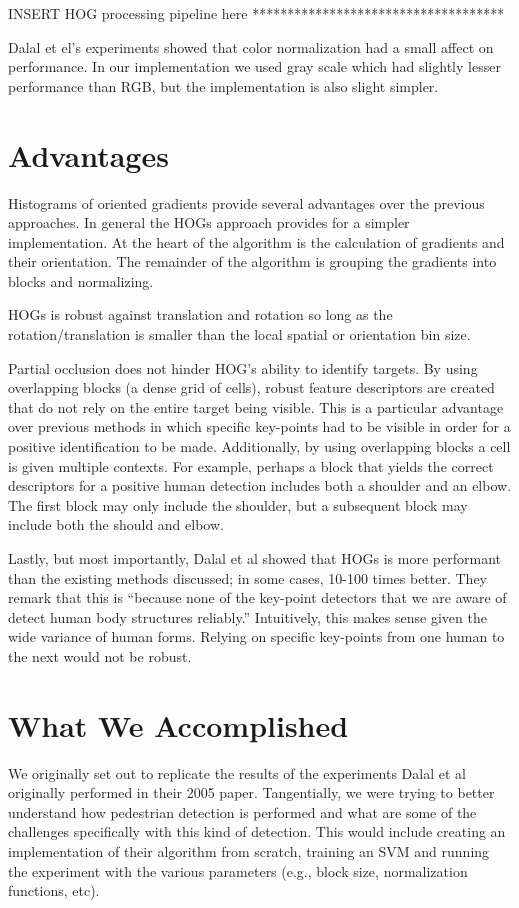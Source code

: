 \documentclass[a4paper,11pt]{article}
\begin{document}
\begin{multicols}{2}
INSERT HOG processing pipeline here ************************************

Dalal et el's experiments showed that color normalization had a small affect on performance. 
In our implementation we used gray scale which had slightly lesser performance than RGB, 
but the implementation is also slight simpler.

\section{Advantages}
Histograms of oriented gradients provide several advantages over the previous approaches. In general the HOGs 
approach provides for a simpler implementation. At the heart of the algorithm is the calculation of gradients 
and their orientation. The remainder of the algorithm is grouping the gradients into blocks and normalizing.

HOGs is robust against translation and rotation so long as the rotation/translation is smaller than the local 
spatial or orientation bin size.

Partial occlusion does not hinder HOG’s ability to identify targets. By using overlapping blocks (a dense grid of cells), 
robust feature descriptors are created that do not rely on the entire target being visible. This is a particular 
advantage over previous methods in which specific key-points had to be visible in order for a positive identification 
to be made. Additionally, by using overlapping blocks a cell is given multiple contexts. For example, perhaps 
a block that yields the correct descriptors for a positive human detection includes both a shoulder and an elbow.
The first block may only include the shoulder, but a subsequent block may include both the should and elbow.

Lastly, but most importantly, Dalal et al showed that HOGs is more performant than the existing methods 
discussed; in some cases, 10-100 times better. They remark that this is “because none of the key-point 
detectors that we are aware of detect human body structures reliably.” Intuitively, this makes sense 
given the wide variance of human forms. Relying on specific key-points from one human to the next would not be robust. 

\section{What We Accomplished}
We originally set out to replicate the results of the experiments Dalal et al originally performed in their 
2005 paper. Tangentially, we were trying to better understand how pedestrian detection is performed and what 
are some of the challenges specifically with this kind of detection. This would include creating an 
implementation of their algorithm from scratch, training an SVM and running the experiment with the 
various parameters (e.g., block size, normalization functions, etc).


\end{multicols}
\end{document}
